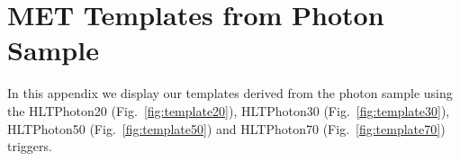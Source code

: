 \section{MET Templates from Photon Sample}
\label{sec:appendix_templates}

In this appendix we display our templates derived from the photon sample 
using the HLTPhoton20 (Fig.~\ref{fig:template20}), HLTPhoton30 (Fig.~\ref{fig:template30}),
HLTPhoton50 (Fig.~\ref{fig:template50}) and HLTPhoton70 (Fig.~\ref{fig:template70}) triggers.

\clearpage

\begin{figure}[hbt]
  \begin{center}

\end{center}
\end{figure}
